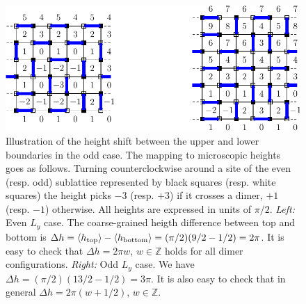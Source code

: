 \documentclass[11pt]{iopart}
\begin{document}
\begin{figure}[ht]
 \begin{center}
 \includegraphics{./figures/shift.pdf}
 \end{center}
\caption{Illustration of the height shift between the upper and lower boundaries in the odd case. The mapping to microscopic heights goes as follows. Turning counterclockwise around a site of the even (resp. odd) sublattice represented by black squares (resp. white squares) the height picks $-3$ (resp. $+3$) if it crosses a dimer, $+1$ (resp. $-1$) otherwise. All heights are expressed in units of $\pi/2$. 
 \emph{Left:} Even $L_y$ case. The coarse-grained heigth difference between top and bottom is $\Delta h=\langle h_{\rm top}\rangle-\langle h_{\rm bottom}\rangle=(\pi/2)(9/2-1/2)=2\pi$. It is easy to check that $\Delta h=2\pi w$, $w\in \mathbb{Z}$ holds for all dimer configurations. \emph{Right:} Odd $L_y$ case. We have $\Delta h=(\pi/2)(13/2-1/2)=3\pi$. It is also easy to check that in general $\Delta h=2\pi (w+1/2)$, $w\in \mathbb{Z}$.}
\label{fig:height_shift}
\end{figure}
\end{document}
